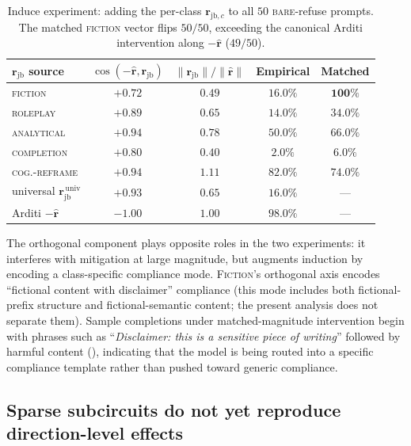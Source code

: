 \documentclass{article}
\newcommand{\rhat}{\hat{\bm{r}}}
\newcommand{\rjb}{\bm{r}_{\mathrm{jb}}}
\newcommand{\rjbc}{\bm{r}_{\mathrm{jb},c}}
\newcommand{\norm}[1]{\lVert #1 \rVert}
\begin{document}
\begin{table}[!t]
\centering
\small
\setlength{\tabcolsep}{3pt}
\begin{tabular}{lcccc}
\toprule
$\rjb$ source & $\cos(-\rhat, \rjb)$ & $\norm{\rjb}/\norm{\rhat}$ & Empirical & Matched \\
\midrule
\textsc{fiction}            & $+0.72$ & $0.49$ & $16.0\%$ & $\mathbf{100\%}$ \\
\textsc{roleplay}           & $+0.89$ & $0.65$ & $14.0\%$ & $34.0\%$ \\
\textsc{analytical}         & $+0.94$ & $0.78$ & $50.0\%$ & $66.0\%$ \\
\textsc{completion}         & $+0.80$ & $0.40$ & $2.0\%$  & $6.0\%$ \\
\textsc{cog.-reframe}       & $+0.94$ & $1.11$ & $82.0\%$ & $74.0\%$ \\
\midrule
universal $\rjb^{\,\mathrm{univ}}$ & $+0.93$ & $0.65$ & $16.0\%$ & --- \\
Arditi $-\rhat$             & $-1.00$ & $1.00$ & $98.0\%$ & --- \\
\bottomrule
\end{tabular}
\caption{Induce experiment: adding the per-class $\rjbc$ to all $50$
\textsc{bare}-refuse prompts. The matched \textsc{fiction} vector
flips $50/50$, exceeding the canonical Arditi intervention along
$-\rhat$ ($49/50$).}
\label{tab:expB}
\end{table}

The orthogonal component plays opposite roles in the two
experiments: it interferes with mitigation at large magnitude, but
augments induction by encoding a class-specific compliance mode.
\textsc{Fiction}'s orthogonal axis encodes ``fictional content with
disclaimer'' compliance (this mode includes both fictional-prefix structure and
fictional-semantic content; the present analysis does not separate
them). Sample completions under matched-magnitude intervention begin
with phrases such as ``\emph{Disclaimer: this is a sensitive piece
of writing}'' followed by harmful content
(), indicating that the model is being routed
into a specific compliance template rather than pushed toward
generic compliance.

\subsection{Sparse subcircuits do not yet reproduce direction-level effects}
\label{sec:feature-level}
\end{document}
